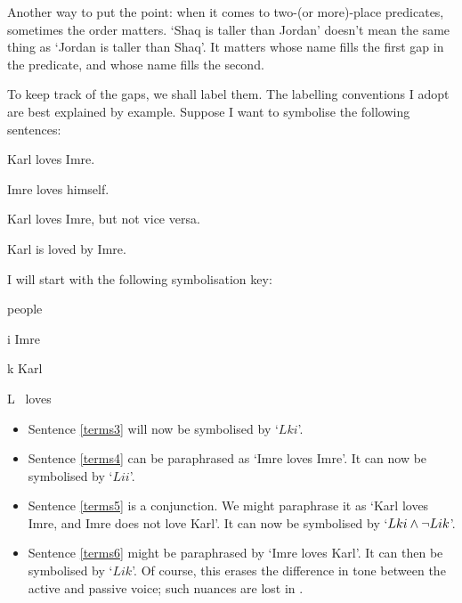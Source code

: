 Another way to put the point: when it comes to two-(or more)-place predicates, sometimes the order matters. `Shaq is taller than Jordan' doesn't mean the same thing as `Jordan is taller than Shaq'. It matters whose name fills the first gap in the predicate, and whose name fills the second. 

To keep track of the gaps, we shall label them. The labelling conventions I  adopt are best explained by example. Suppose I want to symbolise the following sentences:
	\begin{earg}
		\item[\ex{terms3}] Karl loves Imre.
		\item[\ex{terms4}] Imre loves himself.
		\item[\ex{terms5}] Karl loves Imre, but not vice versa.
		\item[\ex{terms6}] Karl is loved by Imre.
	\end{earg}
I will start with the following symbolisation key:
	\begin{ekey}
		\item[\domain] people
		\item[i] Imre
		\item[k] Karl
		\item[L] \ loves 
	\end{ekey}
\begin{itemize}
	\item Sentence \ref{terms3} will now be symbolised by `$Lki$'. 
	\item Sentence \ref{terms4} can be paraphrased as `Imre loves Imre'. It can now be symbolised by `$Lii$'. 
\item Sentence \ref{terms5} is a conjunction. We might paraphrase it as `Karl loves Imre, and Imre does not love Karl'. It can now be symbolised by `$Lki \wedge \neg Lik$'. 
\item Sentence \ref{terms6} might be paraphrased by `Imre loves Karl'. It can then be symbolised by `$Lik$'. Of course, this erases the difference in tone between the active and passive voice; such nuances are lost in \FOL. 
\end{itemize}
